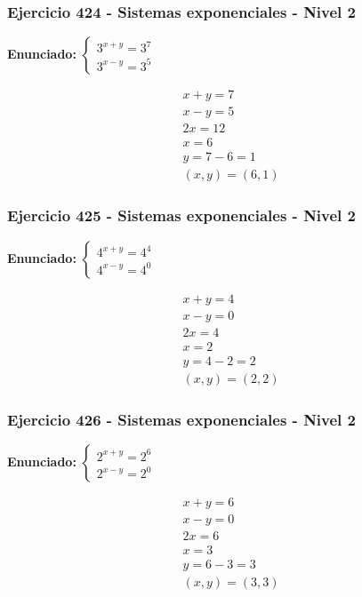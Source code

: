 \documentclass[12pt,a4paper]{article}
\begin{document}
\subsubsection*{Ejercicio 424 - Sistemas exponenciales - Nivel 2}
\textbf{Enunciado:} \(\begin{cases} 3^{x+y}=3^{7}\\ 3^{x-y}=3^{5}\end{cases}\)

\[
\begin{aligned}
x+y=7\\
x-y=5\\
2x=12\\
x=6\\
y=7-6=1\\
\boxed{(x,y)=(6,1)}
\end{aligned}
\]


\subsubsection*{Ejercicio 425 - Sistemas exponenciales - Nivel 2}
\textbf{Enunciado:} \(\begin{cases} 4^{x+y}=4^{4}\\ 4^{x-y}=4^{0}\end{cases}\)

\[
\begin{aligned}
x+y=4\\
x-y=0\\
2x=4\\
x=2\\
y=4-2=2\\
\boxed{(x,y)=(2,2)}
\end{aligned}
\]


\subsubsection*{Ejercicio 426 - Sistemas exponenciales - Nivel 2}
\textbf{Enunciado:} \(\begin{cases} 2^{x+y}=2^{6}\\ 2^{x-y}=2^{0}\end{cases}\)

\[
\begin{aligned}
x+y=6\\
x-y=0\\
2x=6\\
x=3\\
y=6-3=3\\
\boxed{(x,y)=(3,3)}
\end{aligned}
\]
\end{document}
